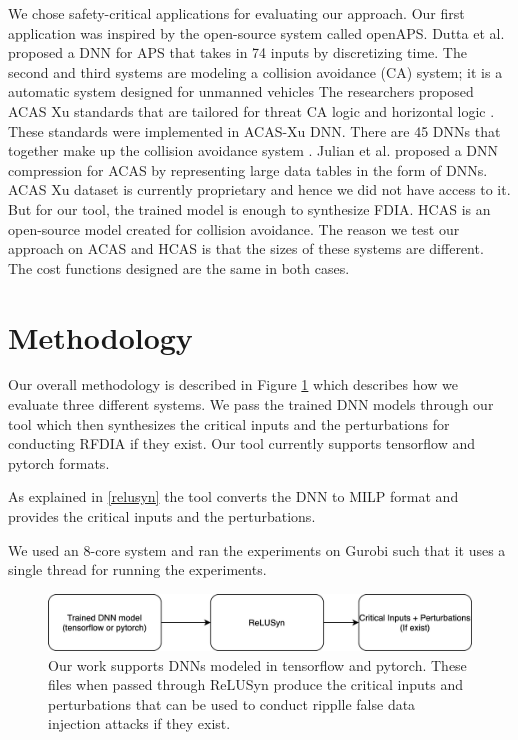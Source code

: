 We chose safety-critical applications for evaluating our approach. 
Our first application was inspired by the open-source system called openAPS.
Dutta et al. \cite{10.1007/978-3-319-99429-1_11} proposed a DNN for APS that takes in 74 inputs by discretizing time.
The second and third systems are modeling a collision avoidance (CA) system; it is a automatic system designed for unmanned vehicles  
The researchers proposed ACAS Xu standards that are tailored for threat CA logic and horizontal logic \cite{7778055}. 
These standards were implemented in \ac{ACAS-Xu} \ac{DNN}.
There are 45 DNNs that together make up the collision avoidance system \cite{Julian_2019}.  
Julian et al. \cite{Julian_2019} proposed a DNN compression for ACAS by representing large data tables in the form of DNNs. ACAS Xu dataset is currently proprietary and hence we did not have access to it. But for our tool, the trained model is enough to synthesize \ac{FDIA}. \ac{HCAS} is an open-source model created for collision avoidance. The reason we test our approach on ACAS and HCAS is that the sizes of these systems are different. The cost functions designed are the same in both cases.

\section{Methodology}
Our overall methodology is described in Figure \ref{fig:methodology-2} which describes how we evaluate three different systems. 
We pass the trained \ac{DNN} models through our tool which then synthesizes the critical inputs and the perturbations for conducting \ac{RFDIA} if they exist. 
Our tool currently supports tensorflow and pytorch formats.

As explained in \ref{relusyn} the tool converts the \ac{DNN} to \ac{MILP} format and provides the critical inputs and the perturbations. 


We used an 8-core system and ran the experiments on Gurobi such that it uses a single thread for running the experiments. 



\begin{figure}
	\centering
	\includegraphics[width=0.7\linewidth]{"Images/Methodology2"}
	\caption[Methodology]{Our work supports DNNs modeled in tensorflow and pytorch. These files when passed through ReLUSyn produce the critical inputs and perturbations that can be used to conduct ripplle false data injection attacks if they exist.}
	\label{fig:methodology-2}
\end{figure}



